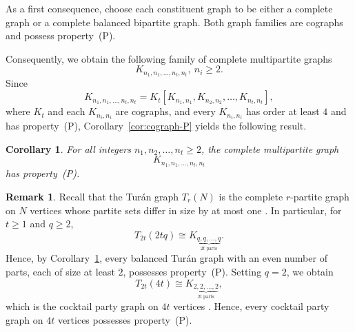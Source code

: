 \documentclass[12pt,reqno]{amsart}
\newtheorem{cor}[thm]{Corollary}
\theoremstyle{definition}
\newtheorem{rem}[thm]{Remark}
\numberwithin{equation}{subsection}
\numberwithin{equation}{section}
\begin{document}
As a first consequence, choose each constituent graph to be either a complete graph or a  complete balanced bipartite graph. Both graph families are cographs and possess property~(P).

Consequently, we obtain the following family of complete multipartite graphs
\[
K_{n_1,n_1,\ldots,n_t,n_t}, \ n_i\ge2.
\]
Since
\[
K_{n_1,n_1,\ldots,n_t,n_t}
=
K_t\!\left[
K_{n_1,n_1},
K_{n_2,n_2},
\ldots,
K_{n_t,n_t}
\right],
\]
where \(K_t\) and each \(K_{n_i,n_i}\) are cographs, and every \(K_{n_i,n_i}\) has order at least \(4\) and has property~(P), Corollary~\ref{cor:cograph-P} yields the following result.

\begin{cor}\label{cor:complete-multipartite}
For all integers $n_1,n_2,\ldots,n_t\geq 2$, the complete multipartite graph
$$
K_{n_1,n_1,\ldots,n_t,n_t}
$$
has property~(P).
\end{cor}

\begin{rem}
Recall that the Tur\'an graph \(T_r(N)\) is the complete \(r\)-partite
graph on \(N\) vertices whose partite sets differ in size by at most
one \cite[p.~181]{diestel}. In particular, for \(t\ge1\) and
\(q\ge2\),
\[
T_{2t}(2tq)
\cong
K_{\underbrace{q,q,\ldots,q}_{2t\text{ parts}}}.
\]
Hence, by Corollary~\ref{cor:complete-multipartite}, every balanced
Tur\'an graph with an even number of parts, each of size at least
\(2\), possesses property~\textup{(P)}.
Setting \(q=2\), we obtain
\[
T_{2t}(4t)
\cong
K_{\underbrace{2,2,\ldots,2}_{2t\text{ parts}}},
\]
which is the cocktail party graph on \(4t\) vertices
\cite[p.~68, Exercise~9(b)]{biggs}. Hence, every cocktail party graph
on \(4t\) vertices possesses property~\textup{(P)}.
\end{rem}
\end{document}
